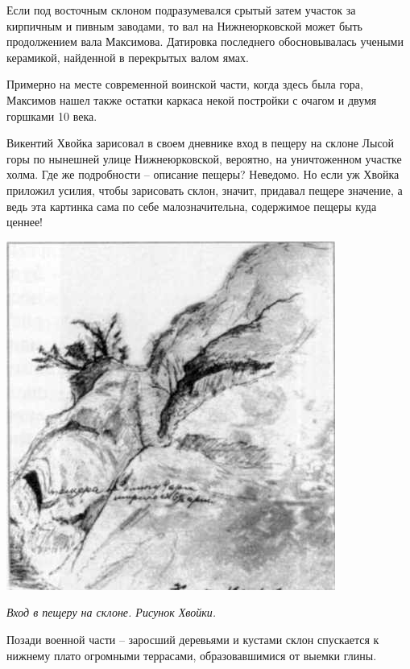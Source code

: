 Если под восточным склоном подразумевался срытый затем участок за кирпичным и пивным заводами, то вал на Нижнеюрковской может быть продолжением вала Максимова. Датировка последнего обосновывалась учеными керамикой, найденной в перекрытых валом ямах.

Примерно на месте современной воинской части, когда здесь была гора, Максимов нашел также остатки каркаса некой постройки с очагом и двумя горшками 10 века.

Викентий Хвойка зарисовал в своем дневнике вход в пещеру на склоне Лысой горы по нынешней улице Нижнеюрковской, вероятно, на уничтоженном участке холма. Где же подробности – описание пещеры? Неведомо. Но если уж Хвойка приложил усилия, чтобы зарисовать склон, значит, придавал пещере значение, а ведь эта картинка сама по себе малозначительна, содержимое пещеры куда ценнее!

\newpage
 
\begin{center}
\includegraphics[width=\linewidth]{chast-kirvys/lys/hv-pesh.jpg}

\textit{Вход в пещеру на склоне. Рисунок Хвойки.}
\end{center} 

Позади военной части – заросший деревьями и кустами склон спускается к нижнему плато огромными террасами, образовавшимися от выемки глины.


